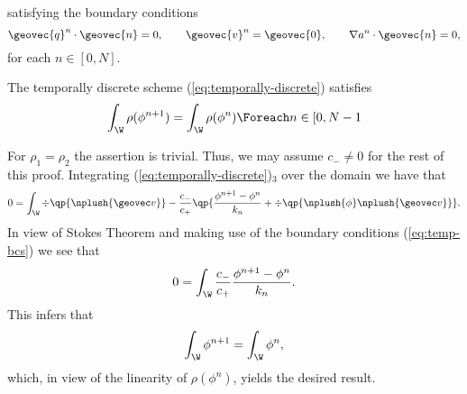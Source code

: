 \documentclass[final]{amsart}
\numberwithin{equation}{section}
\begin{document}
satisfying the boundary conditions
\begin{equation}
  \label{eq:temp-bcs}
  {\geovec{q}}^n \cdot {\geovec{n}} = 0 , \qquad {\geovec{v}}^n ={\geovec{0}}, \qquad \nabla a^n \cdot {\geovec{n}} = 0,
\end{equation}
for each $n\in [0, N]$.
\begin{Pro}
  \label{pro:mass-cons-temp}
  The temporally discrete scheme (\ref{eq:temporally-discrete})
  satisfies
  \begin{equation}
    \int_\W \rho(\phi^{n+1}) = \int_\W \rho(\phi^n) \Foreach n\in [0,N-1
  \end{equation}
\end{Pro}
\begin{Proof}
  For $\rho_1=\rho_2$ the assertion is trivial. Thus, we may assume
  $c_- \not=0$ for the rest of this proof. Integrating
  (\ref{eq:temporally-discrete})$_3$ over the domain we have that
  \begin{equation}
    0 
    = 
    \int_\W
    \div\qp{\nplush{\geovec v}}
    -
    \frac{c_-}{c_+}
    \qp{
      \frac{\phi^{n+1} - \phi^n}{k_n}
      +
      \div\qp{\nplush{\phi}\nplush{\geovec v}}
    }.
  \end{equation}
  In view of Stokes Theorem and making use of the boundary conditions
  (\ref{eq:temp-bcs}) we see that
  \begin{equation}
    0
    =
    \int_\W 
    \frac{c_-}{c_+}
    \frac{\phi^{n+1} - \phi^n}{k_n}.
    \end{equation}
    This infers that
    \begin{equation}
      \int_\W \phi^{n+1} = \int_\W \phi^n,
    \end{equation}
    which, in view of the linearity of $\rho(\phi^n)$, yields the desired result.
\end{Proof}
\end{document}
